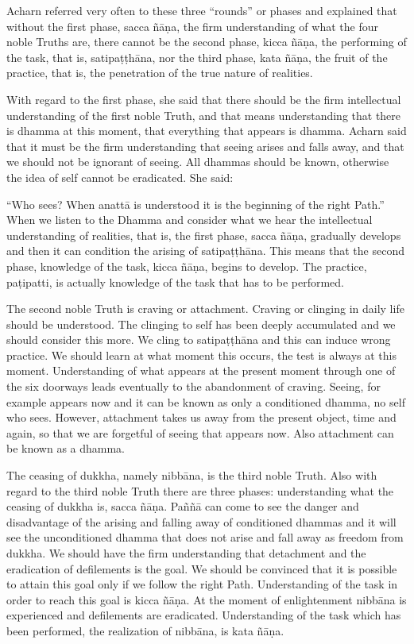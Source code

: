 Acharn referred very often to these three ``rounds'' or phases and
explained that without the first phase, sacca ñāṇa, the firm
understanding of what the four noble Truths are, there cannot be the
second phase, kicca ñāṇa, the performing of the task, that is,
satipaṭṭhāna, nor the third phase, kata ñāṇa, the fruit of the practice,
that is, the penetration of the true nature of realities.

With regard to the first phase, she said that there should be the firm
intellectual understanding of the first noble Truth, and that means
understanding that there is dhamma at this moment, that everything that
appears is dhamma. Acharn said that it must be the firm understanding
that seeing arises and falls away, and that we should not be ignorant of
seeing. All dhammas should be known, otherwise the idea of self cannot
be eradicated. She said:

``Who sees? When anattā is understood it is the beginning of the right
Path.'' When we listen to the Dhamma and consider what we hear the
intellectual understanding of realities, that is, the first phase, sacca
ñāṇa, gradually develops and then it can condition the arising of
satipaṭṭhāna. This means that the second phase, knowledge of the task,
kicca ñāṇa, begins to develop. The practice, paṭipatti, is actually
knowledge of the task that has to be performed.

The second noble Truth is craving or attachment. Craving or clinging in
daily life should be understood. The clinging to self has been deeply
accumulated and we should consider this more. We cling to satipaṭṭhāna
and this can induce wrong practice. We should learn at what moment this
occurs, the test is always at this moment. Understanding of what appears
at the present moment through one of the six doorways leads eventually
to the abandonment of craving. Seeing, for example appears now and it
can be known as only a conditioned dhamma, no self who sees. However,
attachment takes us away from the present object, time and again, so
that we are forgetful of seeing that appears now. Also attachment can be
known as a dhamma.

The ceasing of dukkha, namely nibbāna, is the third noble Truth. Also
with regard to the third noble Truth there are three phases:
understanding what the ceasing of dukkha is, sacca ñāṇa. Paññā can come
to see the danger and disadvantage of the arising and falling away of
conditioned dhammas and it will see the unconditioned dhamma that does
not arise and fall away as freedom from dukkha. We should have the firm
understanding that detachment and the eradication of defilements is the
goal. We should be convinced that it is possible to attain this goal
only if we follow the right Path. Understanding of the task in order to
reach this goal is kicca ñāṇa. At the moment of enlightenment nibbāna is
experienced and defilements are eradicated. Understanding of the task
which has been performed, the realization of nibbāna, is kata ñāṇa.


